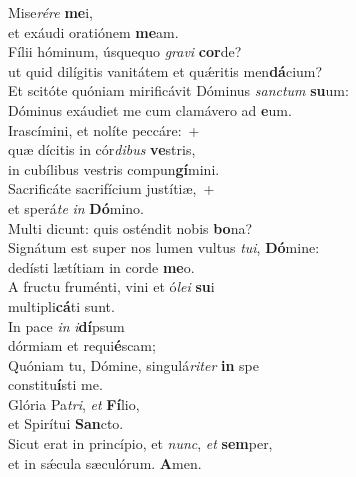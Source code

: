 \evenverse Mise\textit{ré}\textit{re} \textbf{me}i,~\*\\
\evenverse et exáudi oratiónem \textbf{me}am.\\
\oddverse Fílii hóminum, úsquequo \textit{gra}\textit{vi} \textbf{cor}de?~\*\\
\oddverse ut quid dilígitis vanitátem et quǽritis men\textbf{dá}cium?\\
\evenverse Et scitóte quóniam mirificávit Dóminus \textit{san}\textit{ctum} \textbf{su}um:~\*\\
\evenverse Dóminus exáudiet me cum clamávero ad \textbf{e}um.\\
\oddverse Irascímini, et nolíte peccáre:~+\\
\oddverse  quæ dícitis in cór\textit{di}\textit{bus} \textbf{ve}stris,~\*\\
\oddverse in cubílibus vestris compun\textbf{gí}mini.\\
\evenverse Sacrificáte sacrifícium justítiæ,~+\\
\evenverse  et sperá\textit{te} \textit{in} \textbf{Dó}mino.~\*\\
\evenverse Multi dicunt: quis osténdit nobis \textbf{bo}na?\\
\oddverse Signátum est super nos lumen vultus \textit{tu}\textit{i}, \textbf{Dó}mine:~\*\\
\oddverse dedísti lætítiam in corde \textbf{me}o.\\
\evenverse A fructu fruménti, vini et ó\textit{le}\textit{i} \textbf{su}i~\*\\
\evenverse multipli\textbf{cá}ti sunt.\\
\oddverse In pace \textit{in} \textit{i}\textbf{dí}psum~\*\\
\oddverse dórmiam et requi\textbf{é}scam;\\
\evenverse Quóniam tu, Dómine, singulá\textit{ri}\textit{ter} \textbf{in} spe~\*\\
\evenverse constitu\textbf{í}sti me.\\
\oddverse Glória Pa\textit{tri}, \textit{et} \textbf{Fí}lio,~\*\\
\oddverse et Spirítui \textbf{San}cto.\\
\evenverse Sicut erat in princípio, et \textit{nunc}, \textit{et} \textbf{sem}per,~\*\\
\evenverse et in sǽcula sæculórum. \textbf{A}men.\\

